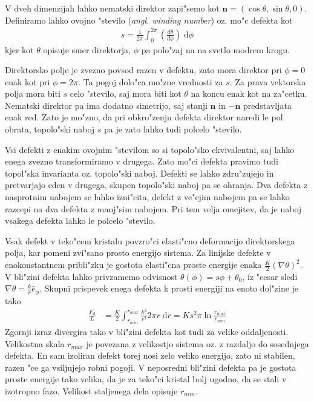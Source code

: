 \documentclass[a4paper,10pt]{article}
\renewcommand{\vec}{\mathbf}
\newcommand{\angl}[1]{(\textit{angl. #1})}
\newcommand{\dd}{\ensuremath{\;\mathrm{d}}}
\begin{document}
V dveh dimenzijah lahko nematski direktor zapi"semo kot $\vec n = (\cos\theta, \sin\theta, 0)$. 
Definiramo lahko ovojno "stevilo \angl{winding number} oz. mo"c defekta kot
\begin{align}
 s = \frac{1}{2\pi}\int_0^{2\pi} \left(\frac{d\theta}{d\phi}\right) \dd \phi
\end{align}
kjer kot $\theta$ opisuje smer direktorja, $\phi$ pa polo"zaj na na svetlo modrem krogu. 

Direktorsko polje je zvezno povsod razen v defektu, zato mora direktor pri $\phi = 0$ enak kot pri $\phi = 2\pi$. 
Ta pogoj dolo"ca mo"zne vrednosti za $s$. 
Za prava vektorska polja mora biti $s$ celo "stevilo, saj mora biti kot $\theta$ na koncu enak kot na za"cetku. 
Nematski direktor pa ima dodatno simetrijo, saj stanji $\vec n$ in $-\vec n$ predstavljata enak red. 
Zato je mo"zno, da pri obkro"zenju defekta direktor naredi le pol obrata, topolo"ski naboj $s$ pa je zato lahko tudi polcelo "stevilo. 

Vsi defekti z enakim ovojnim "stevilom so si topolo"sko ekvivalentni, saj lahko enega zvezno transformiramo v drugega. 
Zato mo"ci defekta pravimo tudi topol"ska invarianta oz. topolo"ski naboj. 
Defekti se lahko zdru"zujejo in pretvarjajo eden v drugega, skupen topolo"ski naboj pa se ohranja. 
Dva defekta z nasprotnim nabojem se lahko izni"cita, defekt z ve"cjim nabojem pa se lahko razcepi na dva defekta z manj"sim nabojem. 
Pri tem velja omejitev, da je naboj vsakega defekta lahko le polcelo "stevilo. 

Vsak defekt v teko"cem kristalu povzro"ci elasti"cno deformacijo direktorskega polja, kar pomeni zvi"sano prosto energijo sistema. 
Za linijske defekte v enokonstantnem pribli"zku je gostota elasti"cna proste energije enaka $\frac{K}{2}(\nabla \theta)^2$. 
V bli"zini defekta lahko privzamemo odvisnost $\theta(\phi) = s \phi + \theta_0$, iz "cesar sledi $\nabla\theta = \frac{k}{r}\hat e_\phi$. 
Skupni prispevek enega defekta k prosti energiji na enoto dol"zine je tako\cite{degennes}
\begin{align}
 \frac{F_d}{L} &= \frac{K}{2} \int_{r_{min}}^{r_{max}} \frac{k^2}{r^2} 2\pi r \dd r = K s^2 \pi \ln{\frac{r_{max}}{r_{min}}}
\end{align}
Zgornji izraz divergira tako v bli"zini defekta kot tudi za velike oddaljenosti. 
Velikostna skala $r_{max}$ je povezana z velikostjo sistema oz. z razdaljo do sosednjega defekta. 
En sam izoliran defekt torej nosi zelo veliko energijo, zato ni stabilen, razen "ce ga vsiljujejo robni pogoji. 
V neposredni bli"zini defekta pa je gostota proste energije tako velika, da je za teko"ci kristal bolj ugodno, da se stali v izotropno fazo. 
Velikost staljenega dela opisuje $r_{min}$. 
\end{document}
